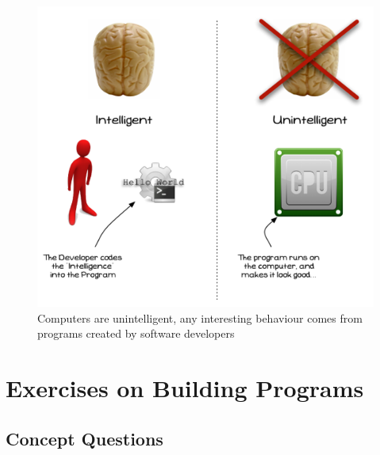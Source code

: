 \begin{figure}[h]
   \centering
   \includegraphics[width=\textwidth]{./topics/programs-and-compilers/diagrams/ProgramIntelligence} 
   \caption{Computers are unintelligent, any interesting behaviour comes from programs created by software developers}
   \label{fig:program-intelligence}
\end{figure}


\clearpage
\section{Exercises on Building Programs} %
\label{sec:examples_and_exercises_on_building_programs}

\subsection{Concept Questions} %
\label{sub:concept_questions_compiler}

